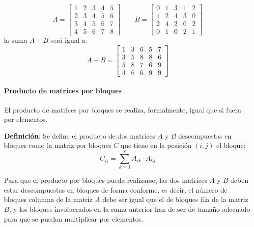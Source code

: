 \[
  A= \left[\begin{array}{c|cc|cc}
    1 & 2 & 3 & 4 & 5 \\
    2 & 3 & 4 & 5 & 6 \\
    3 & 4 & 5 & 6 & 7 \\
    \hline
    4 & 5 & 6 & 7 & 8
  \end{array}\right] \qquad 
  B= \left[\begin{array}{c|cc|cc}
    0 & 1 & 3 & 1 & 2 \\
    1 & 2 & 4 & 3 & 0 \\
    2 & 4 & 2 & 0 & 2 \\
    \hline
    0 & 1 & 0 & 2 & 1
  \end{array}\right]
\]
la suma \(A+B\) será igual a: 
\[
A + B = \left[\begin{array}{c|cc|cc}
  1 & 3 & 6 & 5 & 7 \\
  3 & 5 & 8 & 8 & 6 \\
  5 & 8 & 7 & 6 & 9 \\
  \hline
  4 & 6 & 6 & 9 & 9
\end{array}\right]
\]

\paragraph{Producto de matrices por bloques}

El producto de matrices por bloques se realiza, formalmente, igual que si fuera por elementos.

\textbf{Definición}: Se define el producto de dos matrices \(A\) y \(B\) descompuestas en bloques como la matriz por bloques \(C\) que tiene en la posición \((i,j)\) el bloque:
\[
  C_{ij} = \sum_{k=1}^r A_{ik} \cdot A_{kj}
\]

Para que el producto por bloques pueda realizarse, las dos matrices \(A\) y \(B\) deben estar descompuestas en bloques de forma conforme, es decir, el número de bloques columna de la matriz \(A\) debe ser igual que el de bloques fila de la matriz \(B\), y los bloques involucrados en la suma anterior han de ser de tamaño adecuado para que se puedan multiplicar por elementos.


